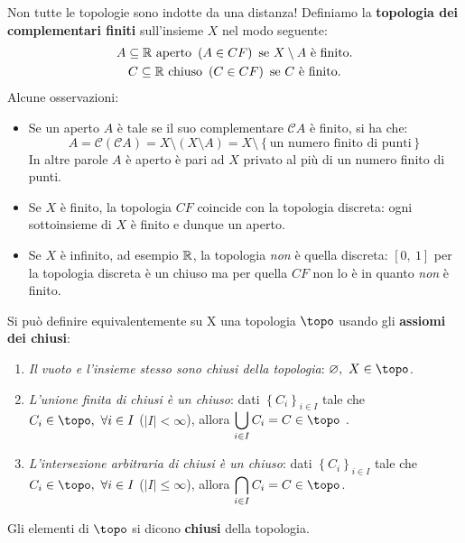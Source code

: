 \begin{attention}
	Non tutte le topologie sono indotte da una distanza! Definiamo la \textbf{topologia dei complementari finiti} sull'insieme $X$ nel modo seguente:
	\begin{gather*}
		A\subseteq \mathbb{R} \text{ aperto } \left(A\in CF\right) \text{ se }  X\setminus A \text{ è finito.}\\
		C\subseteq \mathbb{R} \text{ chiuso } \left(C\in CF\right) \text{ se }  C \text{ è finito.}
	\end{gather*}
	Alcune osservazioni:
	\begin{itemize}
		\item Se un aperto $A$ è tale se il suo complementare $\mathcal{C}A$ è finito, si ha che:
		\begin{equation}
			A=\mathcal{C}\left(\mathcal{C}A\right)=X\setminus\left(X\setminus A\right)=X\setminus\left\{\text{un numero finito di punti}\right\}
		\end{equation}
		In altre parole $A$ è aperto è pari ad $X$ privato al più di un numero finito di punti.
		\item Se $X$ è finito, la topologia $CF$ coincide con la topologia discreta: ogni sottoinsieme di $X$ è finito e dunque un aperto.
		\item Se $X$ è infinito, ad esempio $\mathbb{R}$, la topologia \textit{non} è quella discreta: $[0,\ 1]$ per la topologia discreta è un chiuso ma per quella $CF$ non lo è in quanto \textit{non} è finito.
	\end{itemize}
\end{attention}

\begin{define} Si può definire equivalentemente su X una topologia $\topo$ usando gli \textbf{assiomi dei chiusi}:
\begin{enumerate}
	\item \textit{Il vuoto e l'insieme stesso sono chiusi della topologia}: $\emptyset,\ X\in\topo$.
	\item \textit{L'unione finita di chiusi è un chiuso}: dati $\left\{C_i\right\}_{i\in I}$ tale che $C_i\in\topo,\ \forall i\in I$ ($|I|< \infty$), allora $\displaystyle\union_{i\in I}C_i=C\in\topo$ .
	\item \textit{L'intersezione arbitraria di chiusi è un chiuso}: dati $\left\{C_i\right\}_{i\in I}$ tale che $C_i\in\topo,\ \forall i\in I$ ($|I|\leq \infty$), allora $\displaystyle\inter_{i\in I}C_i=C\in\topo$.
\end{enumerate}
Gli elementi di $\topo$ si dicono \textbf{chiusi} della topologia.
\end{define}

